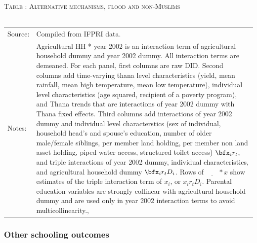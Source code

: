 \begin{table}\hfil\textsc{\footnotesize Table \thetable: Alternative mechanisms, flood and non-Muslims\label{zEm.1999.10.sameN}}\\\setlength{\tabcolsep}{.5pt}\renewcommand{\arraystretch}{.675}\hspace{-2em}\hfil\\\renewcommand{\arraystretch}{1}\hfil\begin{tabular}{>{\hfill\scriptsize}p{1cm}<{}>{\scriptsize}p{12cm}<{\hfill}} Source:& Compiled from IFPRI data. \\[-1ex] Notes:&   \textsf{Agricultural HH * year 2002} is an interaction term of agricultural household dummy and year 2002 dummy. All interaction terms are demeaned. For each panel, first columns are raw DID. Second columns add time-varying thana level characteristics (yield, mean rainfall, mean high temperature, mean low temperature), individual level characteristics (age squared, recipient of a poverty program), and \textsf{Thana trends} that are interactions of year 2002 dummy with Thana fixed effects. Third columns add interactions of year 2002 dummy and individual level characterstics (sex of individual, household head's and spouse's education, number of older male/female siblings, per member land holding, per member non land asset holding, piped water access, structured toilet access) $\bfx_{i}r_{t}$, and triple interactions of year 2002 dummy, individual characteristics, and agricultural household dummy $\bfx_{i}r_{t}D_{i}$. Rows of $\underline{\phantom{mm}}*x$ show estimates of the triple interaction term of $x_{i}$, or $x_{i}r_{t}D_{i}$. Parental education variables are strongly collinear with agricultural household dummy and are used only in year 2002 interaction terms to avoid multicollinearity., \\   \end{tabular} \end{table}

\clearpage
\subsubsection{Other schooling outcomes}

